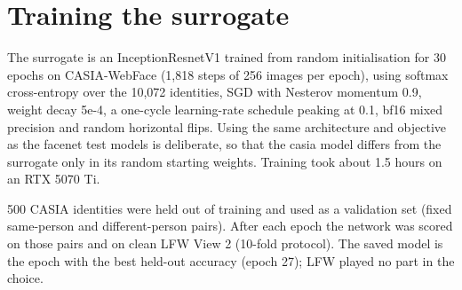 \documentclass[10pt,a4paper]{article}
\begin{document}
\clearpage

\section{Training the surrogate}

The surrogate is an InceptionResnetV1 trained from random initialisation for 30 epochs on CASIA-WebFace (1,818 steps of 256 images per epoch), using softmax cross-entropy over the 10,072 identities, SGD with Nesterov momentum 0.9, weight decay 5e-4, a one-cycle learning-rate schedule peaking at 0.1, bf16 mixed precision and random horizontal flips. Using the same architecture and objective as the facenet test models is deliberate, so that the casia model differs from the surrogate only in its random starting weights. Training took about 1.5 hours on an RTX 5070 Ti.


500 CASIA identities were held out of training and used as a validation set (fixed same-person and different-person pairs). After each epoch the network was scored on those pairs and on clean LFW View 2 (10-fold protocol). The saved model is the epoch with the best held-out accuracy (epoch 27); LFW played no part in the choice.
\end{document}
